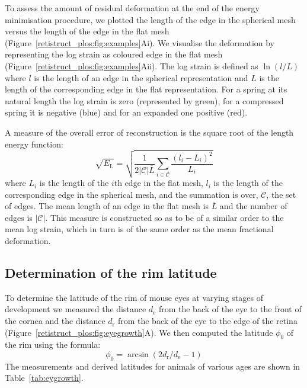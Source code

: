 \documentclass[10pt]{article}
\begin{document}
To assess the amount of residual deformation at the end of the energy
minimisation procedure, we plotted the length of the edge in the
spherical mesh versus the length of the edge in the flat mesh
(Figure~\ref{retistruct_plos:fig:examples}Ai). We visualise the
deformation by representing the log strain as coloured edge in the
flat mesh (Figure~\ref{retistruct_plos:fig:examples}Aii). The log
strain is defined as $\ln(l/L)$ where $l$ is the length of an edge in
the spherical representation and $L$ is the length of the
corresponding edge in the flat representation. For a spring at its
natural length the log strain is zero (represented by green), for a
compressed spring it is negative (blue) and for an expanded one
positive (red).

A measure of the overall error of reconstruction is the square root
of the length energy function:
\begin{equation} 
  \sqrt{E_\mathrm{L}} = \sqrt{\frac{1}{2|\mathcal{C}|\overline{L}}
  \sum_{i\in\mathcal{C}} \frac{(l_i - L_i)^2}{L_i}}
\end{equation} 
where $L_i$ is the length of the $i$th edge in the flat mesh, $l_i$ is
the length of the corresponding edge in the spherical mesh, and the
summation is over, $\mathcal{C}$, the set of edges. The mean length of
an edge in the flat mesh is $\overline{L}$ and the number of edges is
$|\mathcal{C}|$. This measure is constructed so as to be of a similar
order to the mean log strain, which in turn is of the same order as
the mean fractional deformation.  

\subsection*{Determination of the rim latitude}
\label{retistruct_plos:sec:determ-latt-rim}

To determine the latitude of the rim of mouse eyes at varying stages
of development we measured the distance $d_\mathrm{e}$ from the back
of the eye to the front of the cornea and the distance $d_\mathrm{r}$
from the back of the eye to the edge of the retina
(Figure~\ref{retistruct_plos:fig:eyegrowth}A). We then computed the
latitude $\phi_0$ of the rim using the formula:
\begin{equation}
  \label{retistruct_plos:eq:4}
  \phi_0 = \arcsin (2d_\mathrm{r}/d_\mathrm{e}-1)
\end{equation}
The measurements and derived latitudes for animals of various ages
are shown in Table~\ref{tab:eygrowth}.
\end{document}
